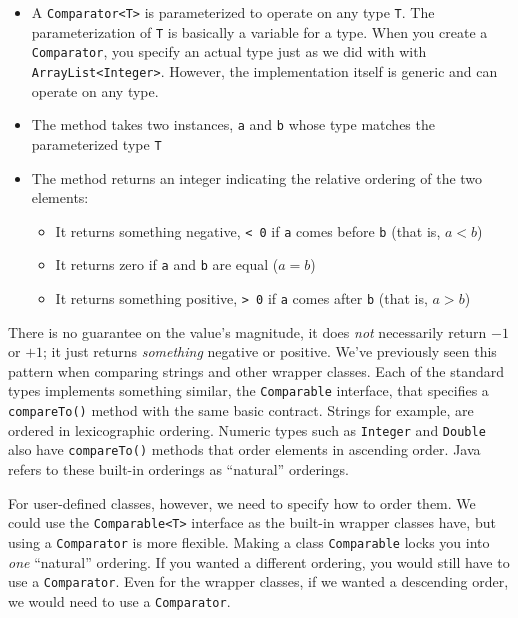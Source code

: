 \begin{itemize}
  \item A \texttt{Comparator<T>} is parameterized to operate on any
  	type \texttt{T}.  The parameterization of \texttt{T}
	is basically a variable for a type.  When you create a 
	\texttt{Comparator}, you specify an actual type just as
	we did with with \texttt{ArrayList<Integer>}.  However, the
	implementation itself is generic and can operate on any type.
  \item The method takes two instances, \texttt{a} and \texttt{b}
    whose type matches the parameterized type \texttt{T}
  \item The method returns an integer indicating the relative ordering of
  	the two elements:
	\begin{itemize}
	  \item It returns something negative, \texttt{< 0} if 
	  \texttt{a} comes before \texttt{b} (that is, $a < b$)
	  \item It returns zero if \texttt{a} and \texttt{b} are
	  equal ($a = b$)
	  \item It returns something positive, \texttt{> 0} if 
	  \texttt{a} comes after \texttt{b} (that is, $a > b$)
	\end{itemize}
\end{itemize}

There is no guarantee on the value's magnitude, it does \emph{not}
necessarily return $-1$ or $+1$; it just returns \emph{something} negative or
positive.  We've previously seen this pattern when comparing strings and
other wrapper classes.  Each of the standard types implements something similar, 
the \texttt{Comparable} interface, that specifies a \texttt{compareTo()} method with the same basic contract.  Strings for example, are
ordered in lexicographic ordering. Numeric types such as 
\texttt{Integer} and \texttt{Double} also have 
\texttt{compareTo()} methods that order elements in ascending order.
Java refers to these built-in orderings as ``natural'' orderings.  

For user-defined classes, however, we need to specify how to order them.  
We could use the \texttt{Comparable<T>} interface as the built-in
wrapper classes have, but using a \texttt{Comparator} is more 
flexible.  Making a class \texttt{Comparable} locks you into \emph{one}
``natural'' ordering.  If you wanted a different ordering, you would still have
to use a \texttt{Comparator}.  Even for the wrapper classes, if we
wanted a descending order, we would need to use a \texttt{Comparator}.


